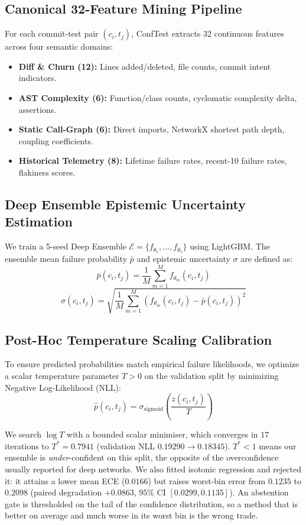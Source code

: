 \documentclass[sigconf,screen]{acmart}
\begin{document}
\subsection{Canonical 32-Feature Mining Pipeline}
For each commit-test pair $(c_i, t_j)$, ConfTest extracts 32 continuous features across four semantic domains:
\begin{itemize}
    \item \textbf{Diff \& Churn (12):} Lines added/deleted, file counts, commit intent indicators.
    \item \textbf{AST Complexity (6):} Function/class counts, cyclomatic complexity delta, assertions.
    \item \textbf{Static Call-Graph (6):} Direct imports, NetworkX shortest path depth, coupling coefficients.
    \item \textbf{Historical Telemetry (8):} Lifetime failure rates, recent-10 failure rates, flakiness scores.
\end{itemize}

\subsection{Deep Ensemble Epistemic Uncertainty Estimation}
We train a 5-seed Deep Ensemble $\mathcal{E} = \{f_{\theta_1}, \dots, f_{\theta_5}\}$ using LightGBM. The ensemble mean failure probability $\bar{p}$ and epistemic uncertainty $\sigma$ are defined as:
\begin{equation}
    \bar{p}(c_i, t_j) = \frac{1}{M} \sum_{m=1}^M f_{\theta_m}(c_i, t_j)
\end{equation}
\begin{equation}
    \sigma(c_i, t_j) = \sqrt{\frac{1}{M} \sum_{m=1}^M \left( f_{\theta_m}(c_i, t_j) - \bar{p}(c_i, t_j) \right)^2}
\end{equation}

\subsection{Post-Hoc Temperature Scaling Calibration}
To ensure predicted probabilities match empirical failure likelihoods, we optimize a scalar temperature parameter $T > 0$ on the validation split by minimizing Negative Log-Likelihood (NLL):
\begin{equation}
    \hat{p}(c_i, t_j) = \sigma_{\text{sigmoid}}\left( \frac{z(c_i, t_j)}{T} \right)
\end{equation}

We search $\log T$ with a bounded scalar minimiser, which converges in $17$ iterations to
$T^* = 0.7941$ (validation NLL $0.19290 \rightarrow 0.18345$). $T^* < 1$ means our ensemble is
\emph{under}-confident on this split, the opposite of the overconfidence usually reported for deep
networks. We also fitted isotonic regression and rejected it: it attains a lower mean ECE
($0.0166$) but raises worst-bin error from $0.1235$ to $0.2098$ (paired degradation $+0.0863$,
$95\%$ CI $[0.0299, 0.1135]$). An abstention gate is thresholded on the tail of the confidence
distribution, so a method that is better on average and much worse in its worst bin is the wrong
trade.
\end{document}
